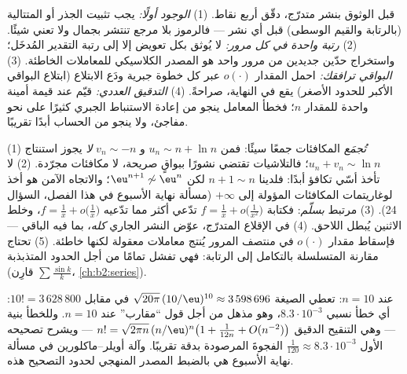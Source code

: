 \begin{method}\label{met:b2:comparison:checklist}
قبل الوثوق بنشر متدرّج، دقّق أربع نقاط.
(1) \emph{الوجود أولًا:} يجب تثبيت الجذر أو المتتالية
(بالرتابة والقيم الوسطى) قبل أي نشر
--- فالرموز بلا مرجع تنتشر بجمال ولا تعني
شيئًا. (2) \emph{رتبة واحدة في كل مرور:} لا يُوثق بكل تعويض
إلا إلى رتبة التقدير المُدخَل؛ واستخراج
حدّين جديدين من مرور واحد هو المصدر الكلاسيكي للمعاملات
الخاطئة. (3) \emph{البواقي ترافقك:} احمل
المقدار $o(\cdot)$ عبر كل خطوة جبرية ودَع الابتلاع
(ابتلاع البواقي الأكبر للحدود الأصغر) يقع في
النهاية، صراحةً. (4) \emph{التدقيق العددي:} قيّم عند قيمة
أمينة واحدة للمقدار $n$؛ فخطأ المعامل ينجو من إعادة الاستنباط
الجبري كثيرًا على نحو مفاجئ، ولا ينجو من الحساب أبدًا تقريبًا.
\end{method}

\begin{remark}\label{rem:b2:comparison:pitfalls}
(1) \emph{تُجمَع} المكافئات جمعًا سيئًا: فمن $u_n \sim n + \ln n$ و
$v_n \sim -n$ \emph{لا} يجوز استنتاج $u_n + v_n \sim \ln
n$؛ فالتلاشيات تقتضي نشورًا ببواقٍ صريحة،
لا مكافئات مجرّدة. (2) لا تأخذ أسّي تكافؤ أبدًا:
فلدينا $n + 1 \sim n$ لكن $\eu^{n+1} \not\sim \eu^n$؛ والاتجاه
الآمن هو أخذ لوغاريتمات المكافئات المؤولة إلى
$+\infty$ (مسألة نهاية الأسبوع في هذا الفصل، السؤال 24). (3)
 مرتبط \emph{بسلّم}: فكتابة
$f = \frac1x + o\bigl(\frac1{x^2}\bigr)$ تدّعي أكثر مما تدّعيه $f =
\frac1x + o\bigl(\frac1x\bigr)$، وخلط الاثنين يُبطل
 اللاحق. (4) في الإقلاع المتدرّج، عوّض
النشر الجاري \emph{كله}، بما فيه الباقي --- فإسقاط
مقدار $o(\cdot)$ في منتصف المرور يُنتج معاملات معقولة لكنها
خاطئة. (5) تحتاج مقارنة المتسلسلة بالتكامل إلى
الرتابة: فهي تفشل تمامًا من أجل الحدود المتذبذبة (قارِن
$\sum\frac{\sin k}k$، \cref{ch:b2:series}).
\end{remark}

\begin{example}\label{ex:b2:comparison:stirlingnum}
عند $n = 10$: تعطي الصيغة $\sqrt{20\pi}\,(10/\eu)^{10}
\approx 3\,598\,696$ في مقابل $10! = 3\,628\,800$: أي خطأ نسبي
$8.3\cdot10^{-3}$، وهو مذهل من أجل قول ``مقارب'' عند
$n = 10$. وللخطأ بنية --- وهي التنقيح الدقيق $n!
= \sqrt{2\pi n}\,(n/\eu)^n\bigl(1 + \frac1{12n} +
O(n^{-2})\bigr)$ --- ويشرح تصحيحه الأول $\frac1{120} \approx
8.3\cdot10^{-3}$ الفجوةَ المرصودة بدقة تقريبًا. وآلة
أويلر--ماكلورين في مسألة نهاية الأسبوع هي بالضبط المصدر
المنهجي لحدود التصحيح هذه.
\end{example}

